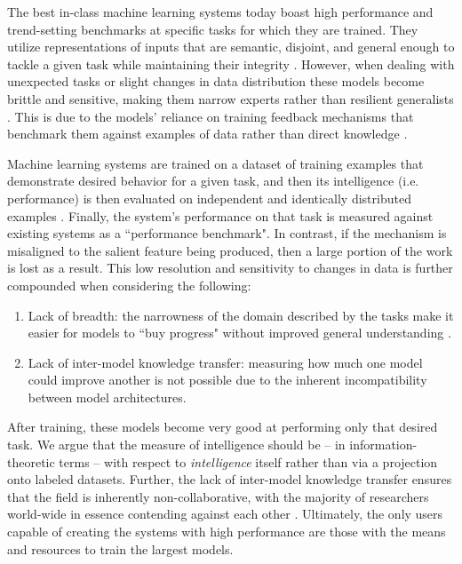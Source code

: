 \documentclass{article}
\begin{document}
The best in-class machine learning systems today boast high performance and trend-setting benchmarks at specific tasks for which they are trained. They utilize representations of inputs that are semantic, disjoint, and general enough to tackle a given task while maintaining their integrity \cite{radford2019language,devlin2018bert}. However, when dealing with unexpected tasks or slight changes in data distribution these models become brittle and sensitive, making them narrow experts rather than resilient generalists \cite{radford2019language}. This is due to the models' reliance on training feedback mechanisms that benchmark them against examples of data rather than direct knowledge \cite{wang2018glue}. 

Machine learning systems are trained on a dataset of training examples that demonstrate desired behavior for a given task, and then its intelligence (i.e. performance) is then evaluated on independent and identically distributed examples \cite{radford2019language, chollet2019measure}. Finally, the system's performance on that task is measured against existing systems as a ``performance benchmark". In contrast, if the mechanism is misaligned to the salient feature being produced, then a large portion of the work is lost as a result. This low resolution and sensitivity to changes in data is further compounded when considering the following:

\begin{enumerate}
	\item Lack of breadth: the narrowness of the domain described by the tasks make it easier for models to ``buy progress" without improved general understanding \cite{chollet2019measure}.
	\item Lack of inter-model knowledge transfer: measuring how much one model could improve another is not possible due to the inherent incompatibility between model architectures. 
\end{enumerate}

After training, these models become very good at performing only that desired task. We argue that the measure of intelligence should be -- in information-theoretic terms -- with respect to \textit{intelligence} itself rather than via a projection onto labeled datasets. Further, the lack of inter-model knowledge transfer ensures that the field is inherently non-collaborative, with the majority of researchers world-wide in essence contending against each other \cite{Riabinin2020learningathome}. Ultimately, the only users capable of creating the systems with high performance are those with the means and resources to train the largest models.
\end{document}
